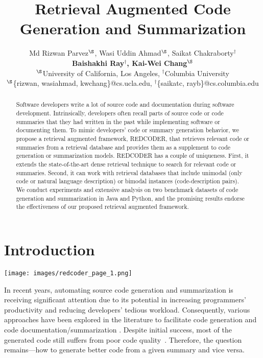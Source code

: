 \documentclass[11pt]{article}
\title{Retrieval Augmented Code Generation and Summarization}
\author{
Md Rizwan Parvez$^\S$, Wasi Uddin Ahmad$^\S$, Saikat Chakraborty$^\dagger$ \\
\textbf{Baishakhi Ray$^\dagger$, Kai-Wei Chang$^\S$} \\
$^\S$University of California, Los Angeles, $^\dagger$Columbia University \\
$^\S${\{rizwan, wasiahmad, kwchang\}@cs.ucla.edu}, $^\dagger${\{saikatc, rayb\}@cs.columbia.edu}
}
\newcommand{\tool}{{REDCODER}\xspace}
\begin{document}
\maketitle


\begin{abstract}







Software developers write a lot of source code and documentation during software development. Intrinsically, developers often recall parts of source code or code summaries that they had written in the past while implementing software or documenting them. To mimic developers' code or summary generation behavior, we propose a retrieval augmented framework, \tool, that retrieves relevant code or summaries from a retrieval database and provides them as a supplement to code generation or summarization models. \tool has a couple of uniqueness. First, it extends the state-of-the-art dense retrieval technique to search for relevant code or summaries. Second, it can work with retrieval databases that include unimodal (only code or natural language description) or bimodal instances (code-description pairs). We conduct experiments and extensive analysis on two benchmark datasets of code generation and summarization in Java and Python, and the promising results endorse the effectiveness of our proposed retrieval augmented framework.


\end{abstract}



\section{Introduction}
\label{sec:into}
\begin{figure*}
\captionsetup[subfigure]{labelformat=empty}
\centering
\texttt{[image: images/redcoder\_page\_1.png]}
\caption{Illustration of our proposed framework \tool for code generation. Given an input summary, we first retrieve top-$k$ candidate code ($k$=1 in this example).  We then aggregate them and based on that a \emph{generator} module  generates the target sequence.  }
\vspace{-2mm}
\label{figure:workflow}
\end{figure*}


In recent years, automating source code generation and summarization is receiving significant attention due to its potential in increasing programmers’ productivity and reducing developers’ tedious workload.
Consequently, various approaches have been explored in the literature to facilitate code generation \cite{yin-neubig-2017-syntactic, gu2016deep} and code documentation/summarization \cite{ahmad-etal-2020-transformer, wei2019code, allamanis2018survey}.
Despite initial success, most of the generated code still suffers from poor code quality~\cite{xu2021ide}. 
Therefore, the question remains---how to generate better code from a given summary and vice versa. 
\end{document}
